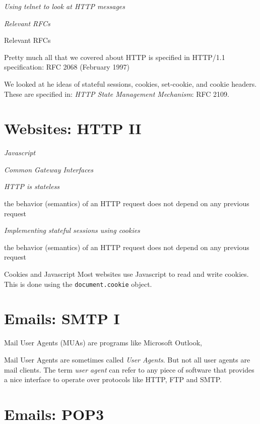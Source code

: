 \frmrule 

\textit{Using telnet to look at HTTP messages}


\frmrule 

\textit{Relevant RFCs}

\begin{sidenote}{Relevant RFCs}

Pretty much all that we covered about HTTP is specified in HTTP/1.1 specification: RFC 2068 (February 1997)

We looked at he ideas of stateful sessions, cookies, set-cookie, and cookie 
headers. These are specified in: \textit{HTTP State Management Mechanism}: RFC 2109.
\end{sidenote}




\section{Websites: HTTP II}


\frmrule 

\textit{Javascript}

\frmrule 

\textit{Common Gateway Interfaces}

\frmrule 

\textit{HTTP is stateless}

the behavior (semantics) of an HTTP request does not depend on
any previous request

\frmrule 

\textit{Implementing stateful sessions using cookies}

the behavior (semantics) of an HTTP request does not depend on
any previous request


\begin{sidenote}{Cookies and Javascript}
Most websites use Javascript to read and write cookies.
This is done using the \lstinline{document.cookie} object.
\end{sidenote}




\section{Emails: SMTP I}

Mail User Agents (MUAs) are programs like Microsoft Outlook, 


Mail User Agents are sometimes called \textit{User Agents}. 
But not all user agents are mail clients. 
The term \textit{user agent} can refer to any 
piece of software that provides a nice interface to operate 
over protocols like HTTP, FTP and SMTP. 

\section{Emails: POP3}